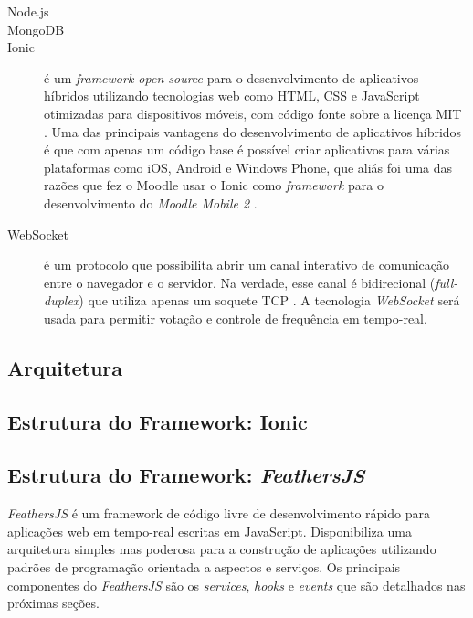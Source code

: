 \begin{description}
  \item[Node.js]
  \item[MongoDB]
  \item[Ionic] é um \textit{framework open-source} para o desenvolvimento de aplicativos
  híbridos utilizando tecnologias web como HTML,
  CSS e JavaScript otimizadas
  para dispositivos móveis, com código fonte sobre a licença MIT \cite{ionic2016}.
  Uma das principais vantagens do desenvolvimento de aplicativos híbridos é que com
  apenas um código base é possível criar aplicativos para várias plataformas como
  iOS, Android e Windows Phone, que aliás foi uma das razões que fez o Moodle
  usar o Ionic como \textit{framework} para o desenvolvimento do \textit{Moodle Mobile 2} \cite{moodle2016}.

  \item[WebSocket] é um protocolo que possibilita abrir um canal interativo de comunicação
  entre o navegador e o servidor. Na verdade, esse canal é bidirecional (\textit{full-duplex})
  que utiliza apenas um soquete TCP \cite{websocket2016}. A tecnologia \textit{WebSocket} será usada
  para permitir votação e controle de frequência em tempo-real.
\end{description}

\subsection{Arquitetura}
\subsection{Estrutura do Framework: Ionic}
\subsection{Estrutura do Framework: \textit{FeathersJS}}

\textit{FeathersJS} é um framework de código livre de desenvolvimento rápido para aplicações
web em tempo-real escritas em JavaScript. Disponibiliza uma arquitetura simples mas poderosa
para a construção de aplicações utilizando padrões de programação orientada a aspectos e serviços.
Os principais componentes do \textit{FeathersJS} são os \textit{services}, \textit{hooks} e
\textit{events} que são detalhados nas próximas seções.


